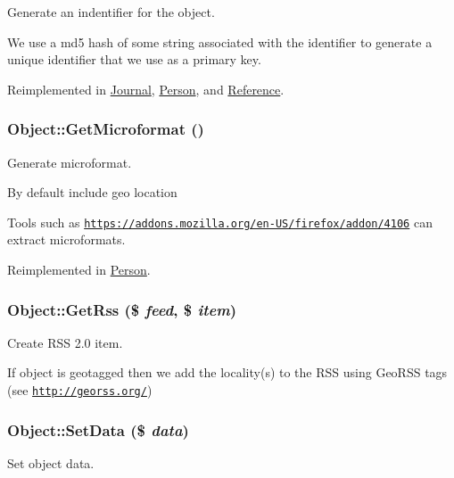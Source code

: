Generate an indentifier for the object. 

We use a md5 hash of some string associated with the identifier to generate a unique identifier that we use as a primary key. 

Reimplemented in \hyperlink{class_journal_d28269cb6daa116d9c26ad91ee0d08f7}{Journal}, \hyperlink{class_person_67edc8688a6119602b69f4641d14892b}{Person}, and \hyperlink{class_reference_654f7079c3dca7b71d4571a0dd5891f2}{Reference}.\hypertarget{class_object_28c07f4c361d113e21a934718c1edcc5}{
\subsubsection{\setlength{\rightskip}{0pt plus 5cm}Object::GetMicroformat ()}}
\label{class_object_28c07f4c361d113e21a934718c1edcc5}


Generate microformat. 

By default include geo location

Tools such as \href{https://addons.mozilla.org/en-US/firefox/addon/4106}{\tt https://addons.mozilla.org/en-US/firefox/addon/4106} can extract microformats. 

Reimplemented in \hyperlink{class_person_706e157885b1f1251a3c9be6992cea66}{Person}.\hypertarget{class_object_bff7e02bed36f0396b0c388bc68f725c}{
\subsubsection{\setlength{\rightskip}{0pt plus 5cm}Object::GetRss (\$ {\em feed}, \/  \$ {\em item})}}
\label{class_object_bff7e02bed36f0396b0c388bc68f725c}


Create RSS 2.0 item. 

If object is geotagged then we add the locality(s) to the RSS using GeoRSS tags (see \href{http://georss.org/}{\tt http://georss.org/}) \hypertarget{class_object_ad5c98da6f5d954fe8ad17294f9d16ce}{
\subsubsection{\setlength{\rightskip}{0pt plus 5cm}Object::SetData (\$ {\em data})}}
\label{class_object_ad5c98da6f5d954fe8ad17294f9d16ce}


Set object data. 

